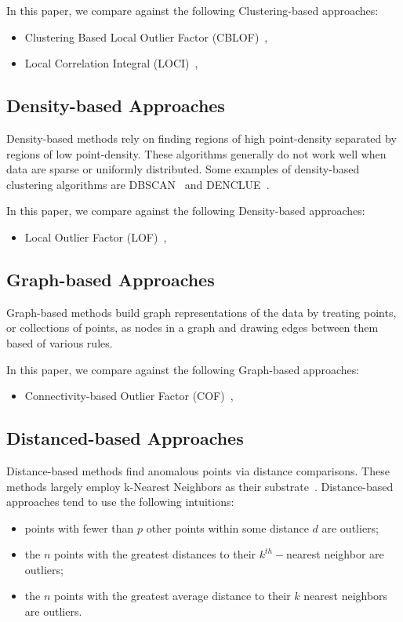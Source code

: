 In this paper, we compare against the following Clustering-based approaches:
\begin{itemize}
    \item Clustering Based Local Outlier Factor (CBLOF)~\cite{he2003cblof},
    \item Local Correlation Integral (LOCI)~\cite{papadimitriou2003loci},
\end{itemize}


\subsection{Density-based Approaches}
\label{subsec:introduction:density-based-approaches}

Density-based methods rely on finding regions of high point-density separated by regions of low point-density.
These algorithms generally do not work well when data are sparse or uniformly distributed.
Some examples of density-based clustering algorithms are
DBSCAN~\cite{ester1996density} and
DENCLUE~\cite{hinneburg1998efficient}.

In this paper, we compare against the following Density-based approaches:
\begin{itemize}
    \item Local Outlier Factor (LOF)~\cite{breunig2000lof},
\end{itemize}


\subsection{Graph-based Approaches}
\label{subsec:introduction:graph-based-approaches}

Graph-based methods build graph representations of the data by treating points, or collections of points, as nodes in a graph and drawing edges between them based of various rules.

In this paper, we compare against the following Graph-based approaches:
\begin{itemize}
    \item Connectivity-based Outlier Factor (COF)~\cite{tang2002cof},
\end{itemize}


\subsection{Distanced-based Approaches}
\label{subsec:related-works:distanced-based-approaches}

Distance-based methods find anomalous points via distance comparisons.
These methods largely employ k-Nearest Neighbors as their substrate~\cite{wang2019progress}.
Distance-based approaches tend to use the following intuitions:
\begin{itemize}
    \item points with fewer than $p$ other points within some distance $d$ are outliers;
    \item the $n$ points with the greatest distances to their $k^{th}-$nearest neighbor are outliers;
    \item the $n$ points with the greatest average distance to their $k$ nearest neighbors are outliers.
\end{itemize}

